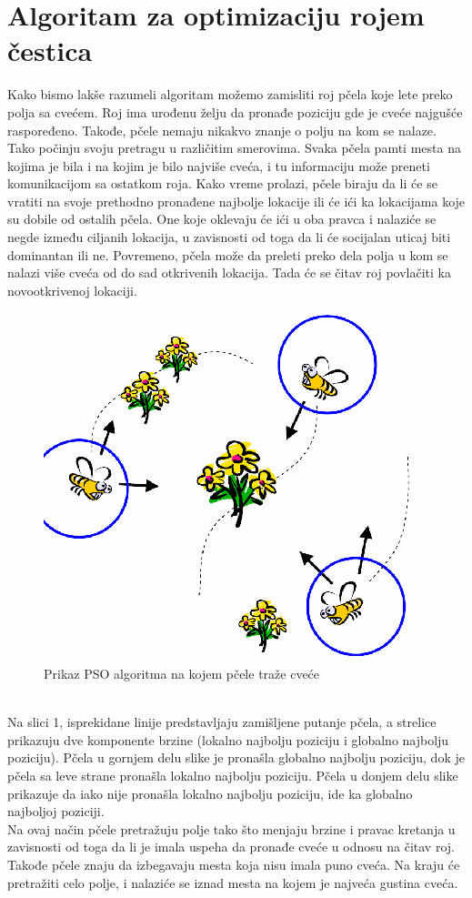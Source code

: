 \documentclass[a4paper]{article}
\begin{document}
\section{Algoritam za optimizaciju rojem čestica}
Kako bismo lakše razumeli algoritam možemo zamisliti roj pčela koje lete preko polja sa cvećem. Roj ima urođenu želju da pronađe poziciju gde je cveće najgušće raspoređeno. Takođe, pčele nemaju nikakvo znanje o polju na kom se nalaze. Tako počinju svoju pretragu u različitim smerovima. Svaka pčela pamti mesta na kojima je bila i na kojim je bilo najviše cveća, i tu informaciju može preneti komunikacijom sa ostatkom roja. Kako vreme prolazi, pčele biraju da li će se vratiti na svoje prethodno pronađene najbolje lokacije ili će ići ka lokacijama koje su dobile od ostalih pčela. One koje oklevaju će ići u oba pravca i nalaziće se negde između ciljanih lokacija, u zavisnosti od toga da li će socijalan uticaj biti dominantan ili ne. Povremeno, pčela može da preleti preko dela polja u kom se nalazi više cveća od do sad otkrivenih lokacija. Tada će se čitav roj povlačiti ka novootkrivenoj lokaciji.
\begin{figure}[htp]
    \centering
    \includegraphics{bees.png}
    \caption{Prikaz PSO algoritma na kojem pčele traže cveće}
    \label{fig:bees}
\end{figure}
\\ \indent Na slici 1, isprekidane linije predstavljaju zamišljene putanje pčela, a strelice prikazuju dve komponente brzine (lokalno najbolju poziciju i globalno najbolju poziciju). Pčela u gornjem delu slike je pronašla globalno najbolju poziciju, dok je pčela sa leve strane pronašla lokalno najbolju poziciju. Pčela u donjem delu slike prikazuje da iako nije pronašla lokalno najbolju poziciju, ide ka globalno najboljoj poziciji. \\
\indent Na ovaj način pčele pretražuju polje tako što menjaju brzine i pravac kretanja u zavisnosti od toga da li je imala uspeha da pronađe cveće u odnosu na čitav roj. Takođe pčele znaju da izbegavaju mesta koja nisu imala puno cveća. Na kraju će pretražiti celo polje, i nalaziće se iznad mesta na kojem je najveća gustina cveća.
\end{document}
